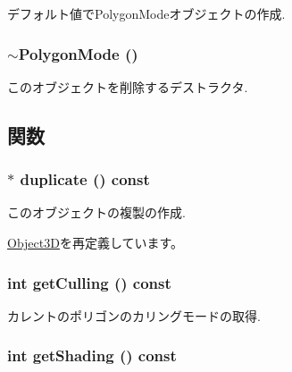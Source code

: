 デフォルト値でPolygonModeオブジェクトの作成. \hypertarget{classm3g_1_1PolygonMode_64ea3958d7ec67fc648707782b2221fe}{
\subsubsection[{$\sim$PolygonMode}]{\setlength{\rightskip}{0pt plus 5cm}$\sim${\bf PolygonMode} ()}}
\label{classm3g_1_1PolygonMode_64ea3958d7ec67fc648707782b2221fe}


このオブジェクトを削除するデストラクタ. 

\subsection{関数}
\hypertarget{classm3g_1_1PolygonMode_a302cb097523e044bc03198ec8448c32}{
\subsubsection[{duplicate}]{ $\ast$ duplicate () const}}
\label{classm3g_1_1PolygonMode_a302cb097523e044bc03198ec8448c32}


このオブジェクトの複製の作成. 

\hyperlink{classm3g_1_1Object3D_a25110dac934f867b83b73ad4741a0f4}{Object3D}を再定義しています。\hypertarget{classm3g_1_1PolygonMode_3b0c0325e93774222d828f2612d59b1b}{
\subsubsection[{getCulling}]{\setlength{\rightskip}{0pt plus 5cm}int getCulling () const}}
\label{classm3g_1_1PolygonMode_3b0c0325e93774222d828f2612d59b1b}


カレントのポリゴンのカリングモードの取得. \hypertarget{classm3g_1_1PolygonMode_c09a62f099e07df16a8c21f997b9f6a6}{
\subsubsection[{getShading}]{\setlength{\rightskip}{0pt plus 5cm}int getShading () const}}
\label{classm3g_1_1PolygonMode_c09a62f099e07df16a8c21f997b9f6a6}


